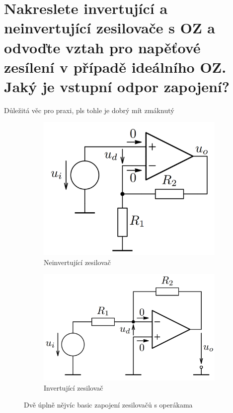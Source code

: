 \documentclass[a4paper,12pt]{article}   %
\begin{document}
\section{Nakreslete invertující a neinvertující zesilovače s OZ a odvoďte vztah pro napěťové zesílení v případě ideálního OZ. Jaký je vstupní odpor zapojení?}
Důležitá věc pro praxi, pls tohle je dobrý mít zmáknutý
\begin{figure}[h!]
    \centering
    \begin{subfigure}{.5\textwidth}
        \centering
        \includegraphics[height=.6\linewidth]{opamp-noninvert.PNG}
        \caption{Neinvertující zesilovač}
    \end{subfigure}%
    \begin{subfigure}{.5\textwidth}
        \centering
        \includegraphics[height=.6\linewidth]{opamp-invert.PNG}
        \caption{Invertující zesilovač}
    \end{subfigure}
    \caption{Dvě úplně nějvíc basic zapojení zesilovačů s operákama}
    \label{fig:operaky}
\end{figure}
\end{document}
